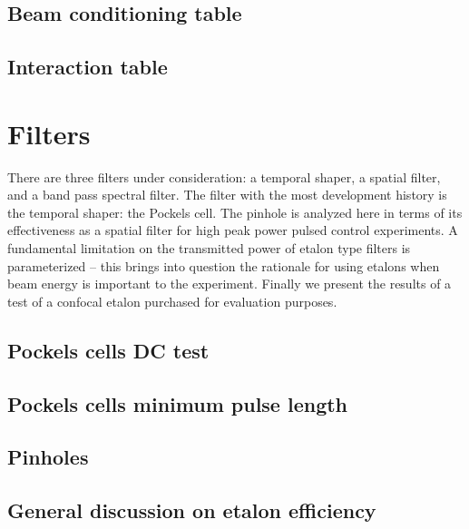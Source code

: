 \subsection{Beam conditioning table}

\subsection{Interaction table}

\section{Filters}
There are three filters under consideration: a temporal shaper, a spatial filter, and a band pass spectral filter. The filter with the most development history is the temporal shaper: the Pockels cell. The pinhole is analyzed here in terms of its effectiveness as a spatial filter for high peak power pulsed control experiments. A fundamental limitation on the transmitted power of etalon type filters is parameterized -- this brings into question the rationale for using etalons when beam energy is important to the experiment. Finally we present the results of a test of a confocal etalon purchased for evaluation purposes.
\subsection{Pockels cells DC test}

\subsection{Pockels cells minimum pulse length}

\subsection{Pinholes}


\subsection{General discussion on etalon efficiency}

